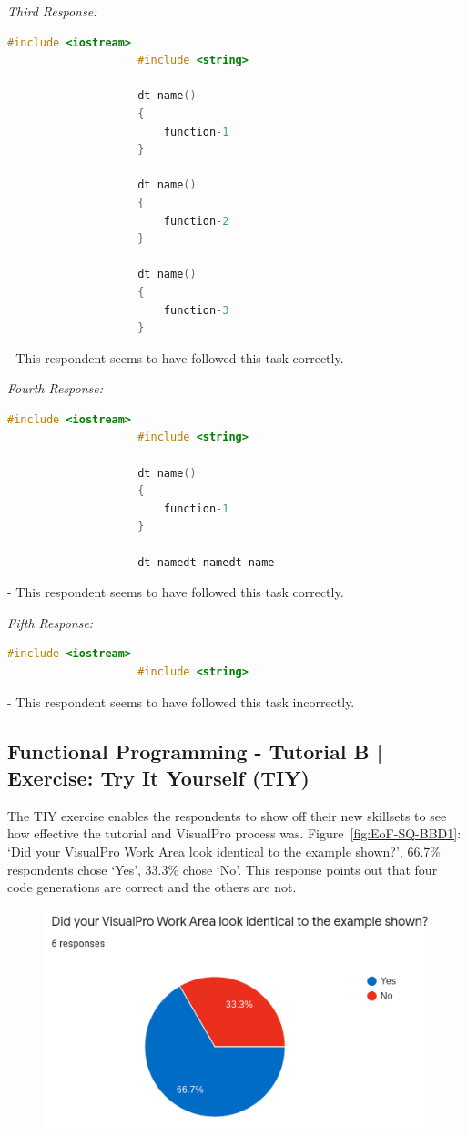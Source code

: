 \documentclass[12pt]{report} %
\begin{document}
				\textit{Third Response:}
				\begin{lstlisting}[language=c++]
					#include <iostream>
					#include <string>

					dt name()
					{
						function-1
					}

					dt name()
					{
						function-2
					}

					dt name()
					{
						function-3
					}
				\end{lstlisting} - This respondent seems to have followed this task correctly.

				\textit{Fourth Response:}
				\begin{lstlisting}[language=c++]
					#include <iostream>
					#include <string>

					dt name()
					{
						function-1
					}

					dt namedt namedt name
				\end{lstlisting} - This respondent seems to have followed this task correctly.

				\textit{Fifth Response:}
				\begin{lstlisting}[language=c++]
					#include <iostream>
					#include <string>
				\end{lstlisting} - This respondent seems to have followed this task incorrectly.


			\subsection{Functional Programming - Tutorial B | Exercise: Try It Yourself (TIY)}
				The TIY exercise enables the respondents to show off their new skillsets to see how effective the tutorial and VisualPro process was. Figure~\ref{fig:EoF-SQ-BBD1}: `Did your VisualPro Work Area look identical to the example shown?', 66.7\% respondents chose `Yes', 33.3\% chose `No'. This response points out that four code generations are correct and the others are not.

				\begin{figure}[H]
					{\includegraphics[scale=0.50]{Figures/VisualPro-Survey_Results/SQ-BBD1.png}}
				\end{figure}
\end{document}
